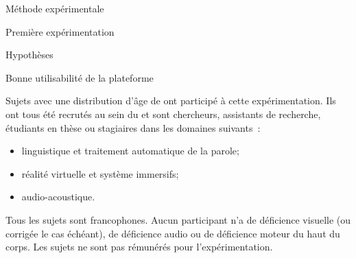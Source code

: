 \documentclass[myfrancais,ngerman,english,frenchb]{mythesis}
\begin{document}
\begin{mychapter}{Méthode expérimentale}
\begin{mysection}{Première expérimentation}
\begin{mysubsection}{Hypothèses}
\begin{myparagraph}{ Bonne utilisabilité de la plateforme}
				\end{myparagraph}
			\end{mysubsection}
			\begin{mysubsection}{Sujets}
				 avec une distribution d'âge de  ont participé à cette expérimentation.
				Ils ont tous été recrutés au sein du  et sont chercheurs, assistants de recherche, étudiants en thèse ou stagiaires dans les domaines suivants~:
				\begin{itemize}
					\item linguistique et traitement automatique de la parole;
					\item réalité virtuelle et système immersifs;
					\item audio-acoustique.
				\end{itemize}

				Tous les sujets sont francophones.
				Aucun participant n'a de déficience visuelle (ou corrigée le cas échéant), de déficience audio ou de déficience moteur du haut du corps.
				Les sujets ne sont pas rémunérés pour l'expérimentation.


\end{mysubsection}
\end{mysection}
\end{mychapter}
\end{document}

